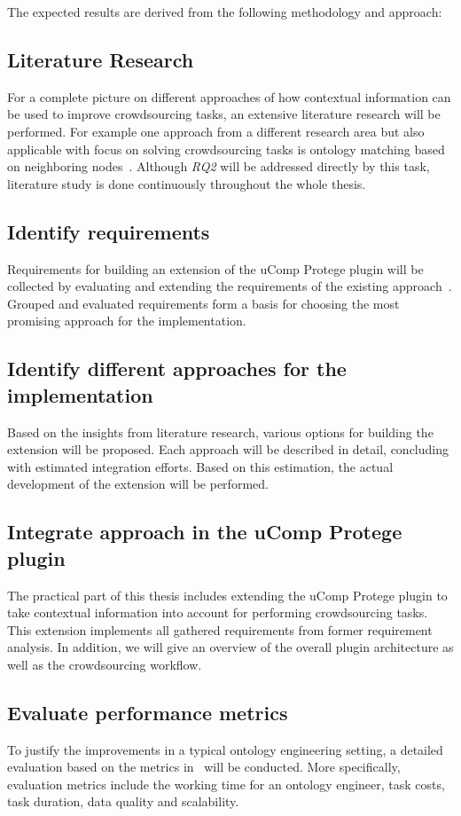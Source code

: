 \documentclass[12pt, notitlepage]{article}
\begin{document}
The expected results are derived from the following methodology and approach:
\subsection{Literature Research}
For a complete picture on different approaches of how contextual information can be used to improve crowdsourcing tasks, an extensive literature research will be performed. For example one approach from a different research area but also applicable with focus on solving crowdsourcing tasks is ontology matching based on neighboring nodes~\cite{hoffmann2010context}. Although \emph{RQ2} will be addressed directly by this task, literature study is done continuously throughout the whole thesis. 
\subsection{Identify requirements}
Requirements for building an extension of the uComp Protege plugin will be collected by evaluating and extending the requirements of the existing approach~\cite{wohlgenannt2016crowd}. Grouped and evaluated requirements form a basis for choosing the most promising approach for the implementation.
\subsection{Identify different approaches for the implementation}
Based on the insights from literature research, various options for building the extension will be proposed. Each approach will be described in detail, concluding with estimated integration efforts. Based on this estimation, the actual development of the extension will be performed. 
\subsection{Integrate approach in the uComp Protege plugin}
The practical part of this thesis includes extending the uComp Protege plugin to take contextual information into account for performing crowdsourcing tasks. This extension implements all gathered requirements from former requirement analysis. In addition, we will give an overview of the overall plugin architecture as well as the crowdsourcing workflow. 
\subsection{Evaluate performance metrics}
To justify the improvements in a typical ontology engineering setting, a detailed evaluation based on the metrics in~\cite{wohlgenannt2016crowd} will be conducted. More specifically, evaluation metrics include the working time for an ontology engineer, task costs, task duration, data quality and scalability.  
\end{document}
